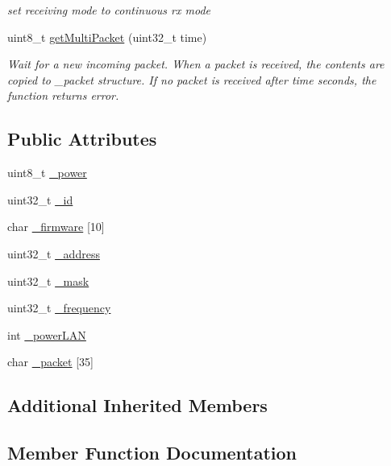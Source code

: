 \begin{DoxyCompactItemize}
\begin{DoxyCompactList}\small\item\em set receiving mode to continuous rx mode \end{DoxyCompactList}\item 
uint8\+\_\+t \hyperlink{class_wasp_sigfox_a5225e31f27b90be16316ff021aeea342}{get\+Multi\+Packet} (uint32\+\_\+t time)
\begin{DoxyCompactList}\small\item\em Wait for a new incoming packet. When a packet is received, the contents are copied to \textquotesingle{}\+\_\+packet\textquotesingle{} structure. If no packet is received after \textquotesingle{}time\textquotesingle{} seconds, the function returns error. \end{DoxyCompactList}\end{DoxyCompactItemize}
\subsection*{Public Attributes}
\begin{DoxyCompactItemize}
\item 
uint8\+\_\+t \hyperlink{class_wasp_sigfox_a38f7ee3421760c13f078d885fbb36528}{\+\_\+power}
\item 
uint32\+\_\+t \hyperlink{class_wasp_sigfox_af85ecdd24a98829e0e0ebec50ff0363c}{\+\_\+id}
\item 
char \hyperlink{class_wasp_sigfox_a0c12325b55f9576f7e6b8bda25064eaa}{\+\_\+firmware} \mbox{[}10\mbox{]}
\item 
uint32\+\_\+t \hyperlink{class_wasp_sigfox_a862a3f4d31688e55b8ae4abedad73ff6}{\+\_\+address}
\item 
uint32\+\_\+t \hyperlink{class_wasp_sigfox_a22ea5bda7954717c4e57880c2ca890eb}{\+\_\+mask}
\item 
uint32\+\_\+t \hyperlink{class_wasp_sigfox_a7e22c7c2a41f2f0363db5cdb330c1afd}{\+\_\+frequency}
\item 
int \hyperlink{class_wasp_sigfox_ab28fc2a3de3d225b34415febccd0a64a}{\+\_\+power\+L\+AN}
\item 
char \hyperlink{class_wasp_sigfox_aaf5e5e719c7fde306d87c3826153408c}{\+\_\+packet} \mbox{[}35\mbox{]}
\end{DoxyCompactItemize}
\subsection*{Additional Inherited Members}


\subsection{Member Function Documentation}
